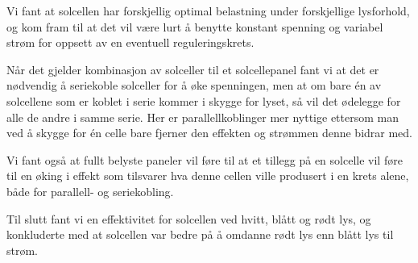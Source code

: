 \documentclass[a4paper,11pt, twocolumn]{article}
\begin{document}
Vi fant at solcellen har forskjellig optimal belastning under forskjellige lysforhold, og kom fram til at det vil være lurt å benytte konstant spenning og variabel strøm for oppsett av en eventuell reguleringskrets. 

Når det gjelder kombinasjon av solceller til et solcellepanel fant vi at det er nødvendig å seriekoble solceller for å øke spenningen, men at om bare \'en av solcellene som er koblet i serie kommer i skygge for lyset, så vil det ødelegge for alle de andre i samme serie. Her er parallellkoblinger mer nyttige ettersom man ved å skygge for \'en celle bare fjerner den effekten og strømmen denne bidrar med.

Vi fant også at fullt belyste paneler vil føre til at et tillegg på en solcelle vil føre til en øking i effekt som tilsvarer hva denne cellen ville produsert i en krets alene, både for parallell- og seriekobling.

Til slutt fant vi en effektivitet for solcellen ved hvitt, blått og rødt lys, og konkluderte med at solcellen var bedre på å omdanne rødt lys enn blått lys til strøm.

\clearpage
\onecolumn
\appendix


\end{document}
